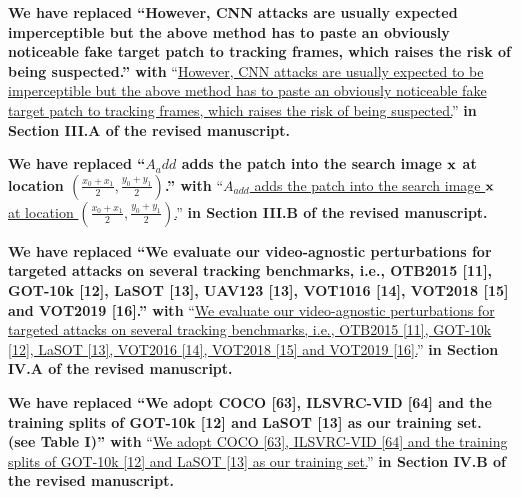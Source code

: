 \documentclass[12pt]{article}
\begin{document}
\textbf{We have replaced ``However, CNN attacks are usually expected imperceptible but the above method has to paste an obviously noticeable fake target patch to tracking frames, which raises the risk of being suspected.'' with}
``\uline{However, CNN attacks are usually expected to be imperceptible but the above method has to paste an obviously noticeable fake target patch to tracking frames, which raises the risk of being suspected.}''
\textbf{in Section III.A of the revised manuscript.}

\textbf{We have  replaced ``$A_add$ adds the patch into the search image $\textbf x$ at location $(\frac{x_0+x_1}{2},\frac{y_0+y_1}{2})$.'' with}
``\uline{$A_{add}$ adds the patch into the search image $\textbf x$ at location $(\frac{x_0+x_1}{2},\frac{y_0+y_1}{2})$.}''
\textbf{in Section III.B of the revised manuscript.}

\textbf{We have replaced ``We evaluate our video-agnostic perturbations for targeted attacks on several tracking benchmarks, i.e., OTB2015 [11], GOT-10k [12], LaSOT [13], UAV123 [13], VOT1016 [14], VOT2018 [15] and VOT2019 [16].'' with}
``\uline{We evaluate our video-agnostic perturbations for targeted attacks on several tracking benchmarks, i.e., OTB2015 [11], GOT-10k [12], LaSOT [13], VOT2016 [14], VOT2018 [15] and VOT2019 [16].}''
\textbf{in Section IV.A of the revised manuscript.}

\textbf{We have replaced ``We adopt COCO [63], ILSVRC-VID [64] and the training splits of GOT-10k [12] and LaSOT [13] as our training set. (see Table I)'' with}
``\uline{We adopt COCO [63], ILSVRC-VID [64] and the training splits of GOT-10k [12] and LaSOT [13] as our training set.}''
\textbf{in Section IV.B of the revised manuscript.}

% 
% 
\end{document}
